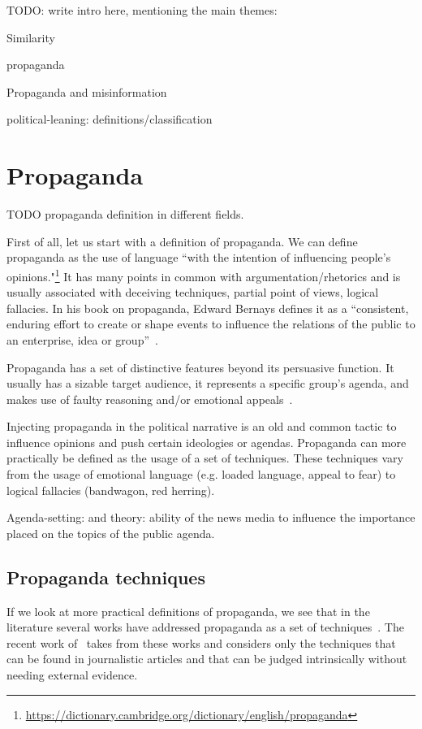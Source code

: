 TODO: write intro here, mentioning the main themes:

Similarity

\gls{propaganda}

Propaganda and misinformation

\Gls{political-leaning}: definitions/classification


\section{Propaganda}
\label{sec:lit_propaganda}

TODO propaganda definition in different fields.

First of all, let us start with a definition of propaganda.
We can define propaganda as the use of language ``with the intention of influencing people's opinions."\footnote{\url{https://dictionary.cambridge.org/dictionary/english/propaganda}}
It has many points in common with argumentation/rhetorics and is usually associated with deceiving techniques, partial point of views, logical fallacies.
In his book on propaganda, Edward Bernays defines it as a ``consistent, enduring effort to create or shape events to influence the relations of the public to an enterprise, idea or group''~\cite{bernays}.

Propaganda has a set of distinctive features beyond its persuasive function. It usually has a sizable target audience, it represents a specific group's agenda, and makes use of faulty reasoning and/or emotional appeals~\cite{miller1939techniques}.

Injecting propaganda in the political narrative is an old and common tactic to influence opinions and push certain ideologies or agendas.
Propaganda can more practically be defined as the usage of a set of techniques. These techniques vary from the usage of emotional language (e.g. loaded language, appeal to fear) to logical fallacies (bandwagon, red herring).

Agenda-setting: \cite{Cohen_1964} and \cite{mccombs1972agenda} theory: ability of the news media to influence the importance placed on the topics of the public agenda.

\subsection{Propaganda techniques}

If we look at more practical definitions of propaganda, we see that in the literature several works have addressed propaganda as a set of techniques~\citep{torok2015symbiotic,miller1939techniques,weston2018rulebook}. The recent work of~\citet{da2019fine} takes from these works and considers only the techniques that can be found in journalistic articles and that can be judged intrinsically without needing external evidence.



